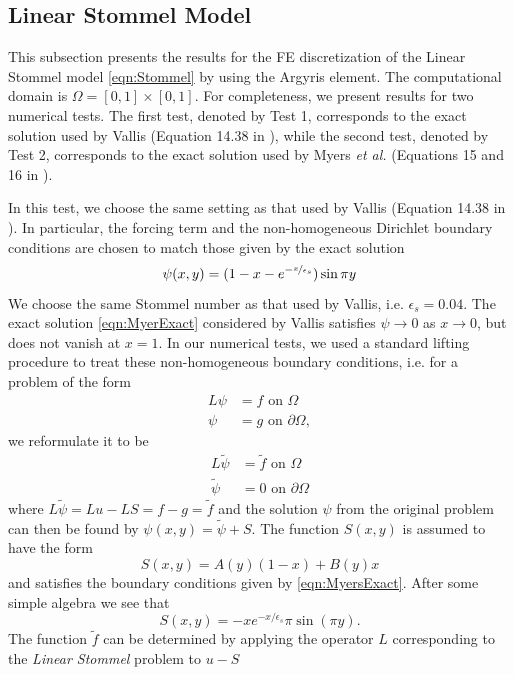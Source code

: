 \subsection{Linear Stommel Model} \label{sse:LSM} This subsection presents the
results for the FE discretization of the Linear Stommel model
\eqref{eqn:Stommel} by using the Argyris element. The computational domain is
$\Omega = [0,1]\times [0,1]$. For completeness, we present results for two
numerical tests. The first test, denoted by Test 1, corresponds to the exact
solution used by Vallis (Equation 14.38 in \cite{Vallis06}), while the second
test, denoted by Test 2, corresponds to the exact solution used by Myers
\emph{et al.} (Equations 15 and 16 in \cite{Myers}).

 In this test, we choose the same setting as that used by Vallis
(Equation 14.38 in \cite{Vallis06}).  In particular, the forcing term and the
non-homogeneous Dirichlet boundary conditions are chosen to match those given by
the exact solution
\begin{equation}
  \psi(x,y) = (1-x-e^{-\nicefrac{x}{\epsilon_s}}) \sin \pi y
  \label{eqn:MyerExact}
\end{equation}
We choose the same Stommel number as that used by Vallis, i.e.
$\epsilon_s=0.04$. The exact solution \eqref{eqn:MyerExact} considered by Vallis
satisfies $\psi \to 0$ as $x \to 0$, but does not vanish at $x=1$. In our
numerical tests, we used a standard lifting procedure to treat these
non-homogeneous boundary conditions, i.e. for a problem of the form
\begin{align*}
  L \psi&=f \text{ on } \Omega\\
  \psi &=g \text{ on } \partial \Omega,
\end{align*}
we reformulate it to be
\begin{align*}
  L\tilde{\psi} &= \tilde{f} \text{ on } \Omega \\
  \tilde{\psi} &= 0 \text{ on } \partial \Omega
\end{align*}
where $L\tilde{\psi} = Lu - LS = f - g = \tilde{f}$ and the solution $\psi$ from
the original problem can then be found by $\psi(x,y) =\tilde{\psi}+S$. The
function $S(x,y)$ is assumed to have the form
\begin{equation*}
  S(x,y) = A(y) (1-x) + B(y) x
\end{equation*}
and satisfies the boundary conditions given by \eqref{eqn:MyersExact}. After
some simple algebra we see that
\begin{equation*}
  S(x,y) = -x e^{-x/\epsilon_s}\pi \sin(\pi y).
\end{equation*}
The function $\tilde{f}$ can be determined by applying the operator $L$
corresponding to the \emph{Linear Stommel} problem to $u - S$

